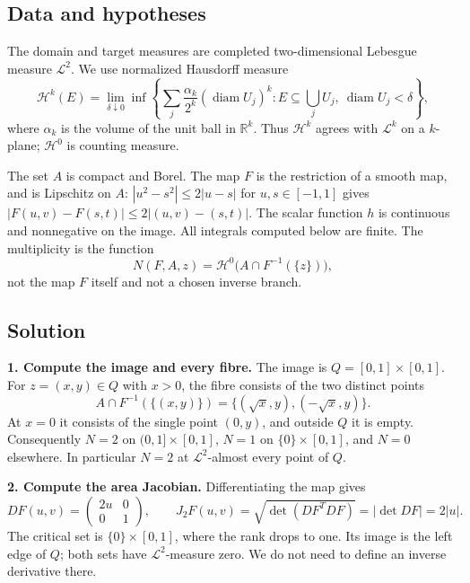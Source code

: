 \documentclass[
  11pt,
]{article}
\begin{document}
\subsection{Data and hypotheses}\label{data-and-hypotheses-10}

The domain and target measures are completed two-dimensional Lebesgue
measure \(\mathcal L^2\). We use normalized Hausdorff measure \[
\mathcal H^k(E)=\lim_{\delta\downarrow0}\inf\left\{
\sum_j\frac{\alpha_k}{2^k}(\operatorname{diam}U_j)^k:
E\subseteq\bigcup_jU_j,\ \operatorname{diam}U_j<\delta\right\},
\] where \(\alpha_k\) is the volume of the unit ball in \(\mathbb R^k\).
Thus \(\mathcal H^k\) agrees with \(\mathcal L^k\) on a \(k\)-plane;
\(\mathcal H^0\) is counting measure.

The set \(A\) is compact and Borel. The map \(F\) is the restriction of
a smooth map, and is Lipschitz on \(A\): \(|u^2-s^2|\leq2|u-s|\) for
\(u,s\in[-1,1]\) gives \(|F(u,v)-F(s,t)|\leq2|(u,v)-(s,t)|\). The scalar
function \(h\) is continuous and nonnegative on the image. All integrals
computed below are finite. The multiplicity is the function \[
N(F,A,z)=\mathcal H^0\bigl(A\cap F^{-1}(\{z\})\bigr),
\] not the map \(F\) itself and not a chosen inverse branch.

\subsection{Solution}\label{solution-10}

\textbf{1. Compute the image and every fibre.} The image is
\(Q=[0,1]\times[0,1]\). For \(z=(x,y)\in Q\) with \(x>0\), the fibre
consists of the two distinct points \[
A\cap F^{-1}(\{(x,y)\})=\{(\sqrt x,y),(-\sqrt x,y)\}.
\] At \(x=0\) it consists of the single point \((0,y)\), and outside
\(Q\) it is empty. Consequently \(N=2\) on \((0,1]\times[0,1]\), \(N=1\)
on \(\{0\}\times[0,1]\), and \(N=0\) elsewhere. In particular \(N=2\) at
\(\mathcal L^2\)-almost every point of \(Q\).

\textbf{2. Compute the area Jacobian.} Differentiating the map gives \[
DF(u,v)=\begin{pmatrix}2u&0\\0&1\end{pmatrix},\qquad
J_2F(u,v)=\sqrt{\det(DF^TDF)}=|\det DF|=2|u|.
\] The critical set is \(\{0\}\times[0,1]\), where the rank drops to
one. Its image is the left edge of \(Q\); both sets have
\(\mathcal L^2\)-measure zero. We do not need to define an inverse
derivative there.
\end{document}
